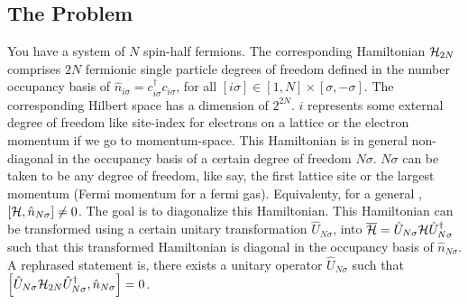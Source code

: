 \documentclass[12pt]{article}
\newcommand{\un}{\ensuremath{\hat{U}_{N\sigma}}}
\newcommand{\no}{\ensuremath{\hat{n}_{N\sigma}}}
\newcommand{\hml}{\ensuremath{\ham_{2N}}}
\begin{document}
\subsection{The Problem} You have a system of \(N\) spin-half fermions. The corresponding Hamiltonian \(\hml\) comprises \(2N\) fermionic single particle degrees of freedom defined in the number occupancy basis of \(\hat{n}_{i\sigma} = c^\dagger_{i\sigma}c_{i\sigma}\), for all \([i\sigma]\in[1,N]\times[\sigma,-\sigma]\). The corresponding Hilbert space has a dimension of \(2^{2N}\). \(i\) represents some external degree of freedom like site-index for electrons on a lattice or the electron momentum if we go to momentum-space. This Hamiltonian is in general non-diagonal in the occupancy basis of a certain degree of freedom \(N\sigma\). \(N\sigma\) can be taken to be any degree of freedom, like say, the first lattice site or the largest momentum (Fermi momentum for a fermi gas). Equivalenty, for a general \ham, \(\left[{\mathcal{H}, \hat{n}_{N\sigma}}\right]\neq 0\). The goal is to diagonalize this Hamiltonian. 
\btm
This Hamiltonian can be transformed using a certain unitary transformation \un, into \(\overline{\ham} = \un \ham \un^\dagger\) such that this transformed Hamiltonian is diagonal in the occupancy basis of \(\hat{n}_{N\sigma}\). A rephrased statement is, there exists a unitary operator \(\un\) such that \(\qq{\un \hml \un^\dagger, \no}=0\).
\etm
\end{document}
